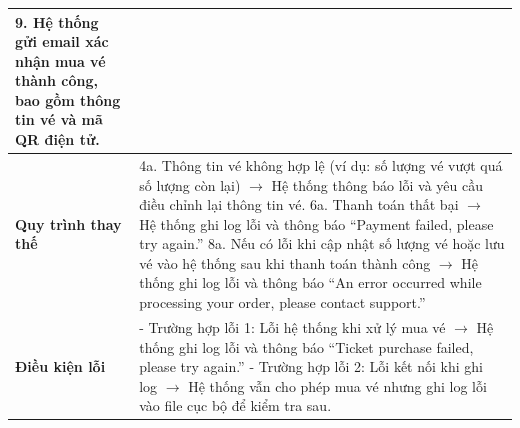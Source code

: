 \begin{longtable}{|p{}|p{}|}
9. Hệ thống gửi email xác nhận mua vé thành công, bao gồm thông tin vé và mã QR điện tử. \\ \hline
\textbf{Quy trình thay thế} &
4a. Thông tin vé không hợp lệ (ví dụ: số lượng vé vượt quá số lượng còn lại) $\rightarrow$ Hệ thống thông báo lỗi và yêu cầu điều chỉnh lại thông tin vé. \newline
6a. Thanh toán thất bại $\rightarrow$ Hệ thống ghi log lỗi và thông báo “Payment failed, please try again.” \newline
8a. Nếu có lỗi khi cập nhật số lượng vé hoặc lưu vé vào hệ thống sau khi thanh toán thành công $\rightarrow$ Hệ thống ghi log lỗi và thông báo “An error occurred while processing your order, please contact support.” \\ \hline
\textbf{Điều kiện lỗi} &
- Trường hợp lỗi 1: Lỗi hệ thống khi xử lý mua vé $\rightarrow$ Hệ thống ghi log lỗi và thông báo “Ticket purchase failed, please try again.” \newline
- Trường hợp lỗi 2: Lỗi kết nối khi ghi log $\rightarrow$ Hệ thống vẫn cho phép mua vé nhưng ghi log lỗi vào file cục bộ để kiểm tra sau. \\ \hline
\end{longtable}

